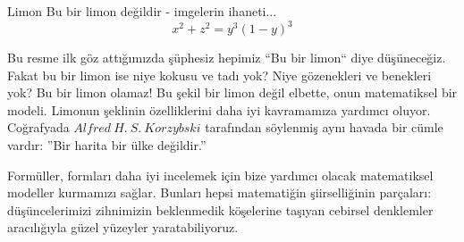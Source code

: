 \begin{surferPage}{Limon}
Bu bir limon değildir - imgelerin ihaneti...\\
\smallskip
\[x^2 + z^2 = y^3 (1 - y)^3\] 


\singlespacing
Bu resme ilk göz attığımızda şüphesiz hepimiz  ``Bu bir limon`` diye düşüneceğiz. Fakat bu bir limon ise niye kokusu ve tadı yok? Niye gözenekleri ve benekleri yok? Bu bir limon olamaz!
\singlespacing
Bu şekil bir limon değil elbette, onun matematiksel bir modeli. Limonun şeklinin özelliklerini daha iyi kavramamıza yardımcı oluyor. Coğrafyada  $Alfred\ H.\ S.\ Korzybski$ tarafından söylenmiş aynı havada bir cümle vardır: ''Bir harita bir ülke değildir.'' \\
\singlespacing

Formüller, formları daha iyi incelemek için bize yardımcı olacak matematiksel modeller kurmamızı sağlar.
\singlespacing
Bunları hepsi matematiğin şiirselliğinin parçaları:   düşüncelerimizi zihnimizin beklenmedik köşelerine taşıyan cebirsel denklemler aracılığıyla güzel yüzeyler yaratabiliyoruz.
\end{surferPage}
